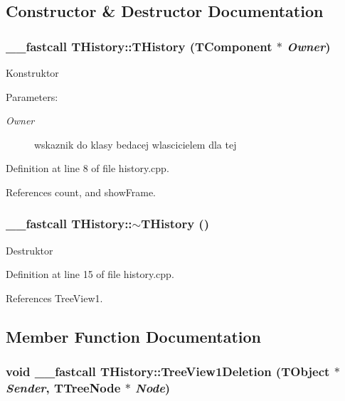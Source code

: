 \subsection{Constructor \& Destructor Documentation}
\hypertarget{classTHistory_a63049b9a1cc855fc3398c8471e1ca6e}{
\subsubsection[THistory]{\setlength{\rightskip}{0pt plus 5cm}\_\-\_\-fastcall THistory::THistory (TComponent $\ast$ {\em Owner})}}
\label{classTHistory_a63049b9a1cc855fc3398c8471e1ca6e}


Konstruktor \begin{Desc}
\item[Parameters:]
\begin{description}
\item[{\em Owner}]wskaznik do klasy bedacej wlascicielem dla tej \end{description}
\end{Desc}


Definition at line 8 of file history.cpp.

References count, and showFrame.\hypertarget{classTHistory_1aea950a4179841c02848a2f578b6545}{
\subsubsection[$\sim$THistory]{\setlength{\rightskip}{0pt plus 5cm}\_\-\_\-fastcall THistory::$\sim$THistory ()}}
\label{classTHistory_1aea950a4179841c02848a2f578b6545}


Destruktor 

Definition at line 15 of file history.cpp.

References TreeView1.

\subsection{Member Function Documentation}
\hypertarget{classTHistory_a54230b362227ac394e19e47471c6ae4}{
\subsubsection[TreeView1Deletion]{\setlength{\rightskip}{0pt plus 5cm}void \_\-\_\-fastcall THistory::TreeView1Deletion (TObject $\ast$ {\em Sender}, \/  TTreeNode $\ast$ {\em Node})}}
\label{classTHistory_a54230b362227ac394e19e47471c6ae4}




